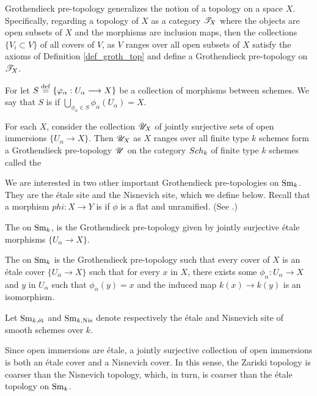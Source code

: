 \begin{rmk}
Grothendieck pre-topology generalizes the notion of a topology on
a space $X$. Specifically, regarding a topology of $X$ as a 
category $\mathscr{T}_X$ where the objects are open subsets of $X$ and 
the morphisms are inclusion maps, then the collections $\{V_i 
\subset V\}$ of all covers of $V$, as $V$ ranges over all open 
subsets of $X$ satisfy the axioms of Definition \ref{def_groth_top} and 
define a Grothendieck pre-topology on $\mathscr{T}_X$.
\end{rmk}

\begin{defn}
For let $S \stackrel{\mathrm{def}}{=} \{\varphi_\alpha: U_\alpha \longrightarrow X\}$ be a collection 
of morphisms between schemes. We say that $S$ is  if $\bigcup_{\phi_\alpha \in S} \phi_\alpha(U_\alpha)
= X$.
\end{defn}

\begin{rmk}
For each $X$, consider the collection $\mathscr{U}_X$ of jointly 
surjective sets of open immersions $\{U_\alpha \to X\}$. Then
$\mathscr{U}_X$ as $X$ ranges over all finite type $k$ schemes 
form a Grothendieck pre-topology $\mathscr{U}$ on the category 
$Sch_k$ of finite type $k$ schemes called the 
\end{rmk}

We are interested in two other important Grothendieck 
pre-topologies on $\mathrm{Sm}_{k}$. They are the \'etale site and the 
Nisnevich site, which we define below. Recall that a morphism 
$phi: X \to Y$ is  if $\phi$ is a flat and 
unramified. (See \cite[\S 1.3]{Milne}.)

\begin{defn}\label{def_sites}
The  on $\mathrm{Sm}_{k}$, is the Grothendieck 
pre-topology given by jointly surjective \'etale morphisms 
$\{U_\alpha \to X\}.$

The  on $\mathrm{Sm}_{k}$ is the Grothendieck 
pre-topology such that every cover of $X$ is an \'etale cover 
$\{U_\alpha \to X\}$ such that for every $x$ in $X$, there exists 
some $\phi_\alpha: U_\alpha \to X$ and $y$ in $U_\alpha$ such that 
$\phi_\alpha(y) = x$ and the induced map $k(x) \to k(y)$ is an 
isomorphism.

Let $\mathrm{Sm}_{k,\mathrm{\acute{e}t}}$ and $\mathrm{Sm}_{k, \mathrm{Nis}}$ denote respectively the \'etale 
and Nisnevich site of smooth schemes over $k$.
\end{defn}

Since open immersions are \'etale, a jointly surjective collection 
of open immersions is both an \'etale cover and a Nisnevich cover. 
In this sense, the Zariski topology is coarser than the Nisnevich 
topology, which, in turn, is coarser than the \'etale topology
on $\mathrm{Sm}_{k}$.

